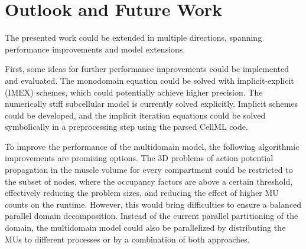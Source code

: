 








\section{Outlook and Future Work}\label{sec:future_work}
 
The presented work could be extended in multiple directions, spanning performance improvements and model extensions.

First, some ideas for further performance improvements could be implemented and evaluated. 
The monodomain equation could be solved with implicit-explicit (IMEX) schemes, which could potentially achieve higher precision. 
The numerically stiff subcellular model is currently solved explicitly. Implicit schemes could be developed, and the implicit iteration equations could be solved symbolically in a preprocessing step using the parsed CellML code. 

To improve the performance of the multidomain model, the following algorithmic improvements are promising options. 
The 3D problems of action potential propagation in the muscle volume for every compartment could be restricted to the subset of nodes, where the occupancy factors are above a certain threshold, effectively reducing the problem sizes, and reducing the effect of higher MU counts on the runtime. However, this would bring difficulties to ensure a balanced parallel domain decomposition.
Instead of the current parallel partitioning of the domain, the multidomain model could also be parallelized by distributing the MUs to different processes or by a combination of both approaches.


